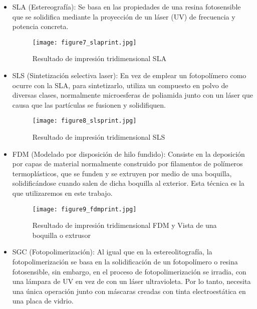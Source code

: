 	\begin{itemize}
		\item SLA (Estereografía): Se basa en las propiedades de una resina fotosensible que se solidifica mediante la proyección de un láser (UV) de frecuencia y potencia concreta.
		
		\begin{figure}[h]
			\centering
			\texttt{[image: figure7\_slaprint.jpg]}
			\caption{Resultado de impresión tridimensional SLA}
		\end{figure}
	
		\clearpage
		\thispagestyle{plain}
			
		\item SLS (Sintetización selectiva laser): En vez de emplear un fotopolímero como ocurre con la SLA, para sintetizarlo, utiliza un compuesto en polvo de diversas clases, normalmente microesferas de poliamida junto con un láser que causa que las partículas se fusionen y solidifiquen. 
		
		\begin{figure}[h]
			\centering
			\texttt{[image: figure8\_slsprint.jpg]}
			\caption{Resultado de impresión tridimensional SLS}
		\end{figure}
		
		\item FDM (Modelado por disposición de hilo fundido): Consiste en la deposición por capas de material normalmente construido por filamentos de polímeros termoplásticos, que se funden y se extruyen por medio de una boquilla, solidificándose cuando salen de dicha boquilla al exterior. Esta técnica es la que utilizaremos en este trabajo.
		
		\begin{figure}[h]
			\centering
			\texttt{[image: figure9\_fdmprint.jpg]}
			\caption{Resultado de impresión tridimensional FDM y Vista de una boquilla o extrusor}
		\end{figure}
	
		\clearpage
		\thispagestyle{plain}
		
		\item SGC (Fotopolimerización): Al igual que en la estereolitografía, la fotopolimerización se basa en la solidificación de
		un fotopolímero o resina fotosensible, sin embargo, en el proceso de
		fotopolimerización se irradia, con una lámpara de UV en vez de con un láser
		ultravioleta. Por lo tanto, necesita una única operación junto con máscaras creadas
		con tinta electroestática en una placa de vidrio.


\end{itemize}
